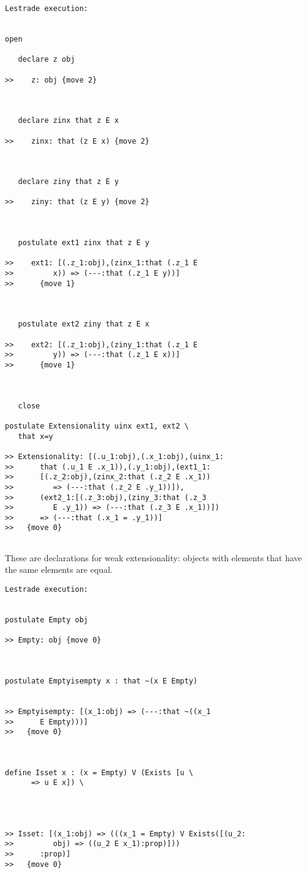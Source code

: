 \documentclass{article}
\begin{document}
\begin{verbatim}Lestrade execution:


open

   declare z obj

>>    z: obj {move 2}



   declare zinx that z E x

>>    zinx: that (z E x) {move 2}



   declare ziny that z E y

>>    ziny: that (z E y) {move 2}



   postulate ext1 zinx that z E y

>>    ext1: [(.z_1:obj),(zinx_1:that (.z_1 E
>>         x)) => (---:that (.z_1 E y))]
>>      {move 1}



   postulate ext2 ziny that z E x

>>    ext2: [(.z_1:obj),(ziny_1:that (.z_1 E
>>         y)) => (---:that (.z_1 E x))]
>>      {move 1}



   close

postulate Extensionality uinx ext1, ext2 \
   that x=y

>> Extensionality: [(.u_1:obj),(.x_1:obj),(uinx_1:
>>      that (.u_1 E .x_1)),(.y_1:obj),(ext1_1:
>>      [(.z_2:obj),(zinx_2:that (.z_2 E .x_1))
>>         => (---:that (.z_2 E .y_1))]),
>>      (ext2_1:[(.z_3:obj),(ziny_3:that (.z_3
>>         E .y_1)) => (---:that (.z_3 E .x_1))])
>>      => (---:that (.x_1 = .y_1))]
>>   {move 0}


\end{verbatim}

These are declarations for weak extensionality:  objects with elements that have the same elements are equal.

\begin{verbatim}Lestrade execution:


postulate Empty obj

>> Empty: obj {move 0}



postulate Emptyisempty x : that ~(x E Empty)


>> Emptyisempty: [(x_1:obj) => (---:that ~((x_1
>>      E Empty)))]
>>   {move 0}



define Isset x : (x = Empty) V (Exists [u \
      => u E x]) \
   



>> Isset: [(x_1:obj) => (((x_1 = Empty) V Exists([(u_2:
>>         obj) => ((u_2 E x_1):prop)]))
>>      :prop)]
>>   {move 0}


\end{verbatim}
\end{document}

